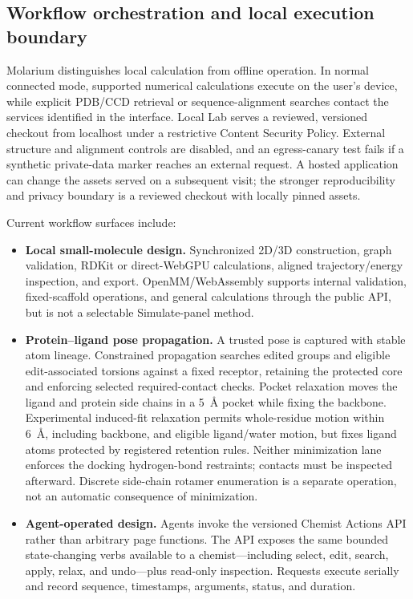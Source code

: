 \documentclass[11pt]{article}
\begin{document}
\begin{small}
\subsection{Workflow orchestration and local execution boundary}

Molarium distinguishes local calculation from offline operation. In normal connected mode, supported numerical calculations execute on the user's device, while explicit PDB/CCD retrieval or sequence-alignment searches contact the services identified in the interface. Local Lab serves a reviewed, versioned checkout from localhost under a restrictive Content Security Policy. External structure and alignment controls are disabled, and an egress-canary test fails if a synthetic private-data marker reaches an external request. A hosted application can change the assets served on a subsequent visit; the stronger reproducibility and privacy boundary is a reviewed checkout with locally pinned assets.

Current workflow surfaces include:

\begin{itemize}[leftmargin=*]
\item \textbf{Local small-molecule design.} Synchronized 2D/3D construction, graph validation, RDKit or direct-WebGPU calculations, aligned trajectory/energy inspection, and export. OpenMM/WebAssembly supports internal validation, fixed-scaffold operations, and general calculations through the public API, but is not a selectable Simulate-panel method.
\item \textbf{Protein--ligand pose propagation.} A trusted pose is captured with stable atom lineage. Constrained propagation searches edited groups and eligible edit-associated torsions against a fixed receptor, retaining the protected core and enforcing selected required-contact checks. Pocket relaxation moves the ligand and protein side chains in a 5~\AA{} pocket while fixing the backbone. Experimental induced-fit relaxation permits whole-residue motion within 6~\AA{}, including backbone, and eligible ligand/water motion, but fixes ligand atoms protected by registered retention rules. Neither minimization lane enforces the docking hydrogen-bond restraints; contacts must be inspected afterward. Discrete side-chain rotamer enumeration is a separate operation, not an automatic consequence of minimization.
\item \textbf{Agent-operated design.} Agents invoke the versioned Chemist Actions API rather than arbitrary page functions. The API exposes the same bounded state-changing verbs available to a chemist---including select, edit, search, apply, relax, and undo---plus read-only inspection. Requests execute serially and record sequence, timestamps, arguments, status, and duration.
\end{itemize}


\end{small}
\end{document}

